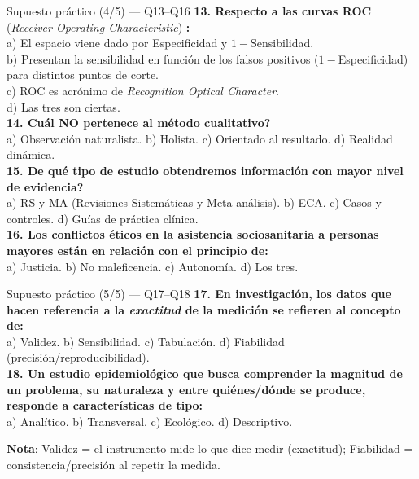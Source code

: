 \documentclass[aspectratio=169,8pt]{beamer}
\begin{document}
\begin{frame}{Supuesto pr\'actico (4/5) --- Q13--Q16}
  \scriptsize
  \textbf{13. Respecto a las curvas ROC} (\emph{Receiver Operating Characteristic}) \textbf{:}\\
  a) El espacio viene dado por Especificidad y $1-$Sensibilidad.\\
  b) Presentan la sensibilidad en funci\'on de los falsos positivos ($1-$Especificidad) para distintos puntos de corte.\\
  c) ROC es acr\'onimo de \emph{Recognition Optical Character}.\\
  d) Las tres son ciertas.\\[4pt]
  \textbf{14. \textquestiondown{}Cu\'al NO pertenece al m\'etodo cualitativo?}\\
  a) Observaci\'on naturalista. \; b) Holista. \; c) Orientado al resultado. \; d) Realidad din\'amica.\\[4pt]
  \textbf{15. \textquestiondown{}De qu\'e tipo de estudio obtendremos informaci\'on con mayor nivel de evidencia?}\\
  a) RS y MA (Revisiones Sistem\'aticas y Meta-an\'alisis). \; b) ECA. \; c) Casos y controles. \; d) Gu\'ias de pr\'actica cl\'inica.\\[4pt]
  \textbf{16. Los conflictos \'eticos en la asistencia sociosanitaria a personas mayores est\'an en relaci\'on con el principio de:}\\
  a) Justicia. \; b) No maleficencia. \; c) Autonom\'ia. \; d) Los tres.
\end{frame}

\begin{frame}{Supuesto pr\'actico (5/5) --- Q17--Q18}
  \scriptsize
  \textbf{17. En investigaci\'on, los datos que hacen referencia a la \emph{exactitud} de la medici\'on se refieren al concepto de:}\\
  a) Validez. \; b) Sensibilidad. \; c) Tabulaci\'on. \; d) Fiabilidad (precisi\'on/reproducibilidad).\\[4pt]
  \textbf{18. Un estudio epidemiol\'ogico que busca comprender la magnitud de un problema, su naturaleza y entre qui\'enes/d\'onde se produce, responde a caracter\'isticas de tipo:}\\
  a) Anal\'itico. \; b) Transversal. \; c) Ecol\'ogico. \; d) Descriptivo.\\[6pt]
  \begin{tcolorbox}[amberbox]
    \scriptsize\textbf{Nota}: Validez = el instrumento mide lo que dice medir (exactitud); Fiabilidad = consistencia/precisi\'on al repetir la medida.
  \end{tcolorbox}
\end{frame}
\end{document}
